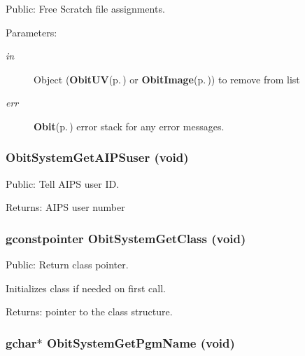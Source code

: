 Public: Free Scratch file assignments. 

\begin{Desc}
\item[Parameters:]
\begin{description}
\item[{\em in}]Object ({\bf Obit\-UV}{\rm (p.\,\pageref{structObitUV})} or {\bf Obit\-Image}{\rm (p.\,\pageref{structObitImage})}) to remove from list \item[{\em err}]{\bf Obit}{\rm (p.\,\pageref{structObit})} error stack for any error messages. \end{description}
\end{Desc}
\subsubsection{ Obit\-System\-Get\-AIPSuser (void)}\label{ObitSystem_8h_a17}


Public: Tell AIPS user ID. 

\begin{Desc}
\item[Returns:]AIPS user number \end{Desc}
\subsubsection{\setlength{\rightskip}{0pt plus 5cm}gconstpointer Obit\-System\-Get\-Class (void)}\label{ObitSystem_8h_a7}


Public: Return class pointer. 

Initializes class if needed on first call. \begin{Desc}
\item[Returns:]pointer to the class structure. \end{Desc}
\subsubsection{\setlength{\rightskip}{0pt plus 5cm}gchar$\ast$ Obit\-System\-Get\-Pgm\-Name (void)}\label{ObitSystem_8h_a13}


